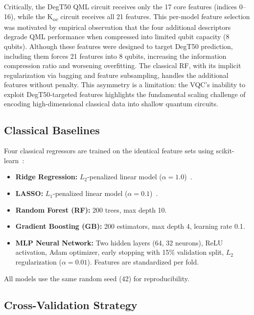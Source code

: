 \documentclass[twoside,twocolumn,9pt]{article}
\newcommand{\degtl}{DegT50}
\newcommand{\koc}{K\textsubscript{oc}}
\begin{document}
Critically, the \degtl{} QML circuit receives only the 17 core features
(indices 0--16), while the \koc{} circuit receives all 21 features.
This per-model feature selection was motivated by empirical observation
that the four additional descriptors degrade QML performance
when compressed into limited qubit capacity (8 qubits). Although
these features were designed to target DegT50 prediction, including them
forces 21 features into 8 qubits, increasing the information compression
ratio and worsening overfitting. The classical RF, with its implicit
regularization via bagging and feature subsampling, handles the additional
features without penalty. This asymmetry is a limitation: the VQC's
inability to exploit DegT50-targeted features highlights the fundamental
scaling challenge of encoding high-dimensional classical data into
shallow quantum circuits.


\subsection{Classical Baselines}
\label{sec:baselines}

Four classical regressors are trained on the identical feature sets
using scikit-learn~\cite{sklearn2011}:

\begin{itemize}[nosep]
  \item \textbf{Ridge Regression:} $L_2$-penalized linear model
        ($\alpha = 1.0$)~\cite{hoerl1970}.
  \item \textbf{LASSO:} $L_1$-penalized linear model
        ($\alpha = 0.1$)~\cite{tibshirani1996}.
  \item \textbf{Random Forest (RF):} 200 trees, max depth 10.
  \item \textbf{Gradient Boosting (GB):} 200 estimators, max depth 4,
        learning rate 0.1.
  \item \textbf{MLP Neural Network:} Two hidden layers (64, 32 neurons),
        ReLU activation, Adam optimizer, early stopping with 15\%
        validation split, $L_2$ regularization ($\alpha = 0.01$).
        Features are standardized per fold.
\end{itemize}

All models use the same random seed (42) for reproducibility.


\subsection{Cross-Validation Strategy}
\label{sec:cv}
\end{document}
